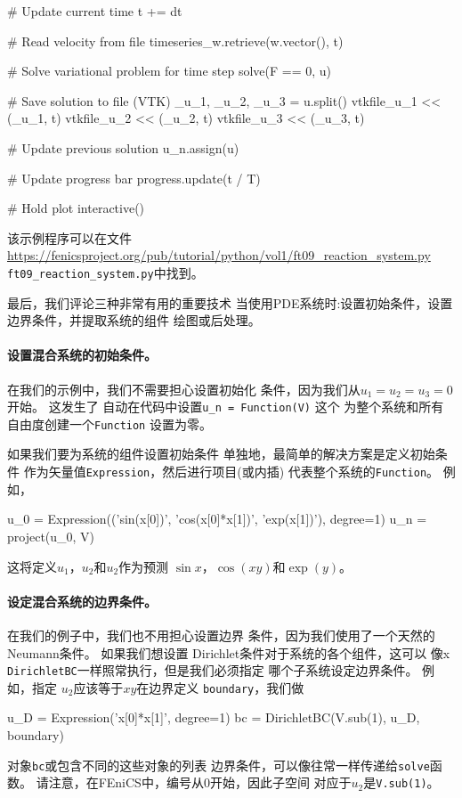 \begin{python}
    # Update current time
    t += dt

    # Read velocity from file
    timeseries_w.retrieve(w.vector(), t)

    # Solve variational problem for time step
    solve(F == 0, u)

    # Save solution to file (VTK)
    _u_1, _u_2, _u_3 = u.split()
    vtkfile_u_1 << (_u_1, t)
    vtkfile_u_2 << (_u_2, t)
    vtkfile_u_3 << (_u_3, t)

    # Update previous solution
    u_n.assign(u)

    # Update progress bar
    progress.update(t / T)

# Hold plot
interactive()
\end{python}
该示例程序可以在文件\url{https://fenicsproject.org/pub/tutorial/python/vol1/ft09_reaction_system.py} {\nolinkurl{ft09_reaction_system.py}}中找到。


最后，我们评论三种非常有用的重要技术
当使用PDE系统时:设置初始条件，设置
边界条件，并提取系统的组件
绘图或后处理。

\paragraph{设置混合系统的初始条件。}

在我们的示例中，我们不需要担心设置初始化
条件，因为我们从$u_1 = u_2 = u_3 = 0$开始。 这发生了
自动在代码中设置\verb!u_n = Function(V)! 这个
为整个系统和所有自由度创建一个\texttt{Function}
设置为零。

如果我们要为系统的组件设置初始条件
单独地，最简单的解决方案是定义初始条件
作为矢量值\texttt{Expression}，然后进行项目(或内插)
代表整个系统的\texttt{Function}。 例如，

\begin{python}
u_0 = Expression(('sin(x[0])', 'cos(x[0]*x[1])', 'exp(x[1])'), degree=1)
u_n = project(u_0, V)
\end{python}
这将定义$u_1$，$u_2$和$u_2$作为预测
$\sin x$，$\cos (xy)$和$\exp(y)$。

\paragraph{设定混合系统的边界条件。}
在我们的例子中，我们也不用担心设置边界
条件，因为我们使用了一个天然的Neumann条件。 如果我们想设置
Dirichlet条件对于系统的各个组件，这可以
像x \texttt{DirichletBC}一样照常执行，但是我们必须指定
哪个子系统设定边界条件。 例如，指定
$u_2$应该等于$xy$在边界定义
\texttt{boundary}，我们做

\begin{python}
u_D = Expression('x[0]*x[1]', degree=1)
bc = DirichletBC(V.sub(1), u_D, boundary)
\end{python}
对象\texttt{bc}或包含不同的这些对象的列表
边界条件，可以像往常一样传递给\texttt{solve}函数。
请注意，在FEniCS中，编号从$0$开始，因此子空间
对应于$u_2$是\texttt{V.sub(1)}。
